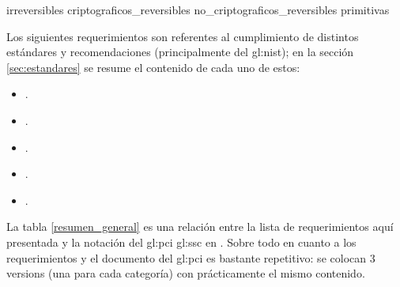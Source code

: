 {irreversibles}
{criptograficos_reversibles}
{no_criptograficos_reversibles}
{primitivas}


Los siguientes requerimientos son referentes al cumplimiento
de distintos estándares y recomendaciones (principalmente del \gls{gl:nist});
en la sección \ref{sec:estandares} se resume el contenido de cada uno de
estos:

\begin{itemize}
  \item {}.
  \item {}.
  \item {}.
  \item {}.
  \item {}.
\end{itemize}

La tabla \ref{resumen_general} es una relación entre la lista de
requerimientos aquí presentada y la notación del \gls{gl:pci} \gls{gl:ssc} en
\cite{pci_tokens}. Sobre todo en cuanto a los requerimientos
 y
 el documento del \gls{gl:pci} es
bastante repetitivo: se colocan 3 versions (una para cada categoría) con
prácticamente el mismo contenido.

